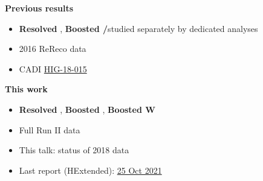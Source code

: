 {  \twoColumns
      {
        \small
        \hspace{1.5cm} \textbf{Previous results}
        \vspace{0.1cm}
        \begin{itemize}
        \item \textcolor{kDarkGreen}{\textbf{Resolved \PQt}},
          \textcolor{kBlue}{\textbf{Boosted \PW/\PQt}}\newline studied separately by dedicated analyses
        \item 2016 ReReco data
        \item CADI \href{https://cms.cern.ch/iCMS/analysisadmin/cadilines?line=HIG-18-015}{\textcolor{kBlue}{HIG-18-015}}
        \end{itemize}
      }
      {
        \small
        \hspace{2cm}  \textbf{This work}
        \vspace{0.1cm}
        \begin{itemize}          
          \item \textcolor{kDarkGreen}{\textbf{Resolved \PQt}},
            \textcolor{kBlue}{\textbf{Boosted \PQt}},  \textcolor{kBlue}{\textbf{Boosted W}}
          \item Full Run II data
          \item This talk: status of 2018 data
          \item Last report (HExtended):
            \href{https://indico.cern.ch/event/1071752/contributions/4578521/attachments/2333742/3977531/HiggsExtended_MKolosova_25Oct2021.pdf}{\textcolor{kBlue}{25
            Oct 2021}}
        \end{itemize}        
      }
}

